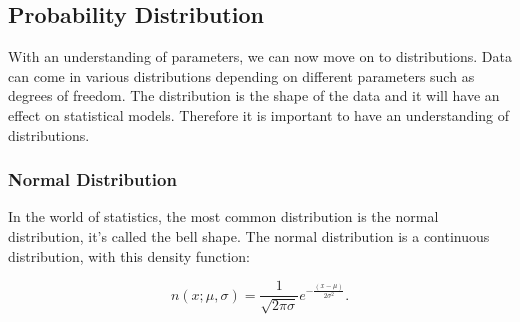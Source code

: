 \subsection{Probability Distribution}
With an understanding of parameters, we can now move on to distributions. Data can come in various distributions depending on different parameters such
as degrees of freedom. The distribution is the shape of the data and it will have
an effect on statistical models. Therefore it is important to have an understanding of distributions.
\subsubsection{Normal Distribution}

In the world of statistics, the most common distribution is the normal distribution, it's called the bell shape. The normal distribution is a continuous distribution, with this density function:

\begin{equation}
n(x;\mu,\sigma) =\frac{1}{\sqrt{2\pi\sigma}}e^{-\frac{(x-\mu)}{2\sigma^2}}.
\end{equation}


